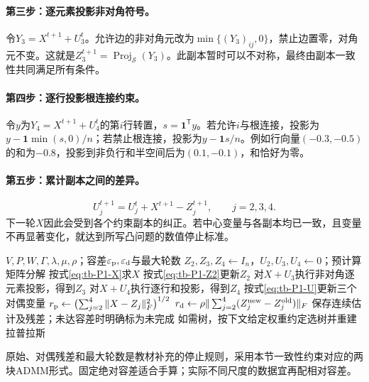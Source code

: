 \documentclass[UTF8,11pt,fontset=fandol,openany,oneside]{ctexbook}
\theoremstyle{definition}
\theoremstyle{remark}
\numberwithin{equation}{chapter}
\begin{document}
\paragraph{第三步：逐元素投影非对角符号。}
令$Y_3=X^{t+1}+U_3^t$。允许边的非对角元改为$\min\{(Y_3)_{ij},0\}$，禁止边置零，对角元不变。这就是$Z_3^{t+1}=\operatorname{Proj}_{\mathcal S}(Y_3)$。此副本暂时可以不对称，最终由副本一致性共同满足所有条件。

\paragraph{第四步：逐行投影根连接约束。}
令$y$为$Y_4=X^{t+1}+U_4^t$的第$i$行转置，$s=\mathbf1^{\mathsf T}y$。若允许$i$与根连接，投影为
$y-\mathbf1\min(s,0)/n$；若禁止根连接，投影为$y-\mathbf1s/n$。例如行向量$(-0.3,-0.5)$的和为$-0.8$，投影到非负行和半空间后为$(0.1,-0.1)$，和恰好为零。

\paragraph{第五步：累计副本之间的差异。}
\begin{equation}
 U_j^{t+1}=U_j^t+X^{t+1}-Z_j^{t+1},\qquad j=2,3,4.
 \label{eq:tb-P1-U}
\end{equation}
下一轮$X$因此会受到各个约束副本的纠正。若中心变量与各副本均已一致，且变量不再显著变化，就达到所写凸问题的数值停止标准。

\begin{algorithm}[htbp]
\caption{P1拉普拉斯估计：四副本ADMM的等价代数整理}
\label{alg:tb-P1-ADMM}
\begin{algorithmic}[1]
\Require $V,P,W,\Gamma,\lambda,\mu,\rho$；容差$\varepsilon_{\rm p},\varepsilon_{\rm d}$与最大轮数
\State $Z_2,Z_3,Z_4\gets I_n$，$U_2,U_3,U_4\gets0$；预计算矩阵分解
\Repeat
 \State 按式\eqref{eq:tb-P1-X}求$X$
 \State 按式\eqref{eq:tb-P1-Z2}更新$Z_2$
 \State 对$X+U_3$执行非对角逐元素投影，得到$Z_3$
 \State 对$X+U_4$执行逐行和投影，得到$Z_4$
 \State 按式\eqref{eq:tb-P1-U}更新三个对偶变量
 \State $r_{\rm p}\gets\bigl(\sum_{j=2}^4\|X-Z_j\|_F^2\bigr)^{1/2}$
 \State $r_{\rm d}\gets\rho\|\sum_{j=2}^4(Z_j^{\rm new}-Z_j^{\rm old})\|_F$
\State 保存连续估计及残差；未达容差时明确标为未完成
\State 如需树，按下文给定权重约定选树并重建拉普拉斯
\end{algorithmic}
\end{algorithm}
原始、对偶残差和最大轮数是教材补充的停止规则，采用本节一致性约束对应的两块ADMM形式。固定绝对容差适合手算；实际不同尺度的数据宜再配相对容差。
\end{document}
